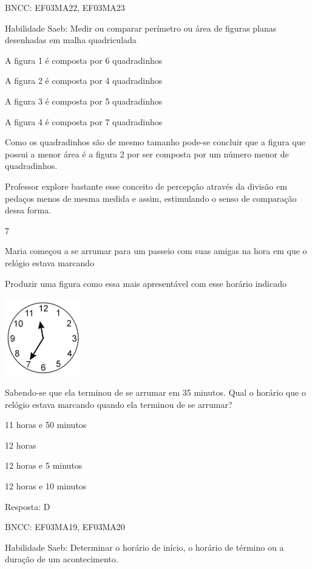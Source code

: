\begin{escolha}
{\begin{escolha}
{BNCC: EF03MA22, EF03MA23

Habilidade Saeb: Medir ou comparar perímetro ou área de figuras planas
desenhadas em malha quadriculada

A figura 1 é composta por 6 quadradinhos

A figura 2 é composta por 4 quadradinhos

A figura 3 é composta por 5 quadradinhos

A figura 4 é composta por 7 quadradinhos

Como os quadradinhos são de mesmo tamanho pode-se concluir que a figura
que possui a menor área é a figura 2 por ser composta por um número
menor de quadradinhos.

Professor explore bastante esse conceito de percepção através da divisão
em pedaços menos de mesma medida e assim, estimulando o senso de
comparação dessa forma.

\num{7}

Maria começou a se arrumar para um passeio com suas amigas na hora em
que o relógio estava marcando

Produzir uma figura como essa mais apresentável com esse horário
indicado

\includegraphics[width=1.29487in,height=1.32633in]{media/image134.png}

Sabendo-se que ela terminou de se arrumar em 35 minutos. Qual o horário
que o relógio estava marcando quando ela terminou de se arrumar?

\begin{escolha}

\item
  11 horas e 50 minutos
\item
  12 horas
\item
  12 horas e 5 minutos
\item
  12 horas e 10 minutos
\end{escolha}

Resposta: D

BNCC: EF03MA19, EF03MA20

Habilidade Saeb: Determinar o horário de início, o horário de término ou
a duração de um acontecimento.

}
\end{escolha}}
\end{escolha}
